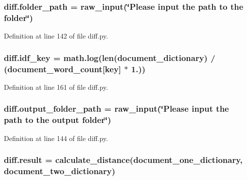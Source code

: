 \subsubsection[{\texorpdfstring{folder\+\_\+path}{folder_path}}]{\setlength{\rightskip}{0pt plus 5cm}diff.\+folder\+\_\+path = raw\+\_\+input(\char`\"{}Please input the path to the folder\char`\"{})}\hypertarget{namespacediff_adccd64c100d50ed0e87d46c33e8636eb}{}\label{namespacediff_adccd64c100d50ed0e87d46c33e8636eb}


Definition at line 142 of file diff.\+py.

\subsubsection[{\texorpdfstring{idf\+\_\+key}{idf_key}}]{\setlength{\rightskip}{0pt plus 5cm}diff.\+idf\+\_\+key = math.\+log(len({\bf document\+\_\+dictionary}) / ({\bf document\+\_\+word\+\_\+count}\mbox{[}key\mbox{]} $\ast$ 1.))}\hypertarget{namespacediff_a1798972d3d6361a79c16d8470bf3471d}{}\label{namespacediff_a1798972d3d6361a79c16d8470bf3471d}


Definition at line 161 of file diff.\+py.

\subsubsection[{\texorpdfstring{output\+\_\+folder\+\_\+path}{output_folder_path}}]{\setlength{\rightskip}{0pt plus 5cm}diff.\+output\+\_\+folder\+\_\+path = raw\+\_\+input(\char`\"{}Please input the path to the output folder\char`\"{})}\hypertarget{namespacediff_aed454348ccff9ceb835a6c22de15fa95}{}\label{namespacediff_aed454348ccff9ceb835a6c22de15fa95}


Definition at line 144 of file diff.\+py.

\subsubsection[{\texorpdfstring{result}{result}}]{\setlength{\rightskip}{0pt plus 5cm}diff.\+result = {\bf calculate\+\_\+distance}({\bf document\+\_\+one\+\_\+dictionary}, {\bf document\+\_\+two\+\_\+dictionary})}\hypertarget{namespacediff_a5df2e8041c6fff30558b49edee35438a}{}\label{namespacediff_a5df2e8041c6fff30558b49edee35438a}


